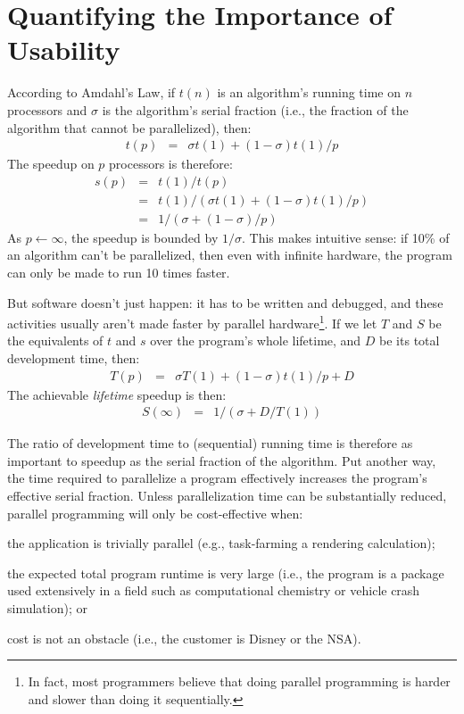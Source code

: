 \section{Quantifying the Importance of Usability\label{s:quant}}

According to Amdahl's Law,
if $t(n)$ is an algorithm's running time on $n$ processors
and $\sigma$ is the algorithm's serial fraction
(i.e., the fraction of the algorithm that cannot be parallelized),
then:
\begin{eqnarray*}
t(p) & = & {\sigma}t(1) + (1 - {\sigma})t(1)/p
\end{eqnarray*}
The speedup on $p$ processors is therefore:
\begin{eqnarray*}
s(p) & = & t(1)/t(p) \\
     & = & t(1)/({\sigma}t(1) + (1 - {\sigma})t(1)/p) \\
     & = & 1/({\sigma} + (1 - {\sigma})/p)
\end{eqnarray*}
As $p{\leftarrow}{\infty}$, the speedup is bounded by $1/{\sigma}$.
This makes intuitive sense:
if 10\% of an algorithm can't be parallelized,
then even with infinite hardware,
the program can only be made to run 10 times faster.

But software doesn't just happen:
it has to be written and debugged,
and these activities usually aren't made faster by parallel hardware\footnote{In fact,
most programmers believe that doing parallel programming is harder and slower than doing it sequentially.}.
If we let $T$ and $S$ be the equivalents of $t$ and $s$ over the program's whole lifetime,
and $D$ be its total development time,
then:
\begin{eqnarray*}
T(p) & = & {\sigma}T(1) + (1 - {\sigma})t(1)/p + D
\end{eqnarray*}
The achievable \emph{lifetime} speedup is then:
\begin{eqnarray*}
S(\infty) & = & 1/({\sigma} + D/T(1))
\end{eqnarray*}

The ratio of development time to (sequential) running time is therefore as important to speedup
as the serial fraction of the algorithm.
Put another way,
the time required to parallelize a program effectively increases the program's effective serial fraction.
Unless parallelization time can be substantially reduced,
parallel programming will only be cost-effective when:
\begin{itemlist}
\item	the application is trivially parallel (e.g., task-farming a rendering calculation);
\item	the expected total program runtime is very large
	(i.e., the program is a package used extensively in a field
	such as computational chemistry or vehicle crash simulation);
	or
\item	cost is not an obstacle (i.e., the customer is Disney or the NSA).
\end{itemlist}

